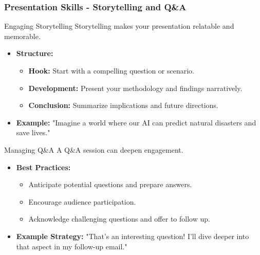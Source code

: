 \documentclass{beamer}
\begin{document}
\begin{frame}[fragile]
    \frametitle{Presentation Skills - Storytelling and Q\&A}
    \begin{block}{Engaging Storytelling}
        Storytelling makes your presentation relatable and memorable.
        \begin{itemize}
            \item \textbf{Structure:}
                \begin{itemize}
                    \item \textbf{Hook:} Start with a compelling question or scenario.
                    \item \textbf{Development:} Present your methodology and findings narratively.
                    \item \textbf{Conclusion:} Summarize implications and future directions.
                \end{itemize}
            \item \textbf{Example:} "Imagine a world where our AI can predict natural disasters and save lives."
        \end{itemize}
    \end{block}

    \begin{block}{Managing Q\&A}
        A Q\&A session can deepen engagement.
        \begin{itemize}
            \item \textbf{Best Practices:}
                \begin{itemize}
                    \item Anticipate potential questions and prepare answers.
                    \item Encourage audience participation.
                    \item Acknowledge challenging questions and offer to follow up.
                \end{itemize}
            \item \textbf{Example Strategy:} "That's an interesting question! I'll dive deeper into that aspect in my follow-up email."
        \end{itemize}
    \end{block}
\end{frame}
\end{document}
